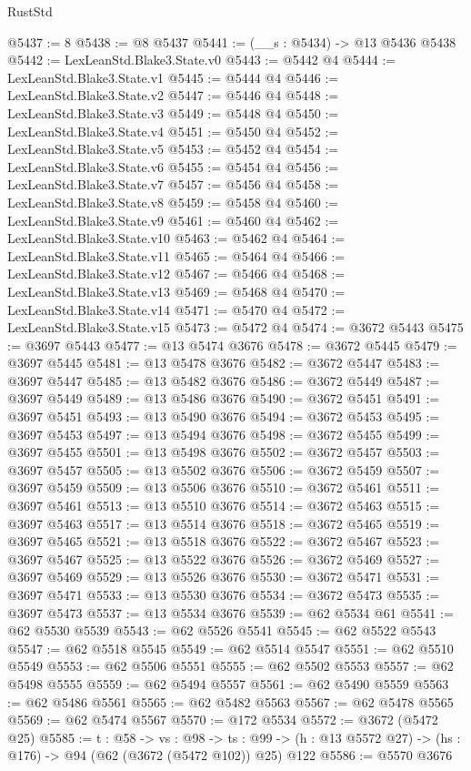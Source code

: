 \begin{lexlean}{RustStd}
\begin{coremodule}
{\begin{coremodule}
{{{{{{{{{{{@5437 := 8
@5438 := @8 @5437
@5441 := (__s : @5434) -> @13 @5436 @5438
@5442 := LexLeanStd.Blake3.State.v0
@5443 := @5442 @4
@5444 := LexLeanStd.Blake3.State.v1
@5445 := @5444 @4
@5446 := LexLeanStd.Blake3.State.v2
@5447 := @5446 @4
@5448 := LexLeanStd.Blake3.State.v3
@5449 := @5448 @4
@5450 := LexLeanStd.Blake3.State.v4
@5451 := @5450 @4
@5452 := LexLeanStd.Blake3.State.v5
@5453 := @5452 @4
@5454 := LexLeanStd.Blake3.State.v6
@5455 := @5454 @4
@5456 := LexLeanStd.Blake3.State.v7
@5457 := @5456 @4
@5458 := LexLeanStd.Blake3.State.v8
@5459 := @5458 @4
@5460 := LexLeanStd.Blake3.State.v9
@5461 := @5460 @4
@5462 := LexLeanStd.Blake3.State.v10
@5463 := @5462 @4
@5464 := LexLeanStd.Blake3.State.v11
@5465 := @5464 @4
@5466 := LexLeanStd.Blake3.State.v12
@5467 := @5466 @4
@5468 := LexLeanStd.Blake3.State.v13
@5469 := @5468 @4
@5470 := LexLeanStd.Blake3.State.v14
@5471 := @5470 @4
@5472 := LexLeanStd.Blake3.State.v15
@5473 := @5472 @4
@5474 := @3672 @5443
@5475 := @3697 @5443
@5477 := @13 @5474 @3676
@5478 := @3672 @5445
@5479 := @3697 @5445
@5481 := @13 @5478 @3676
@5482 := @3672 @5447
@5483 := @3697 @5447
@5485 := @13 @5482 @3676
@5486 := @3672 @5449
@5487 := @3697 @5449
@5489 := @13 @5486 @3676
@5490 := @3672 @5451
@5491 := @3697 @5451
@5493 := @13 @5490 @3676
@5494 := @3672 @5453
@5495 := @3697 @5453
@5497 := @13 @5494 @3676
@5498 := @3672 @5455
@5499 := @3697 @5455
@5501 := @13 @5498 @3676
@5502 := @3672 @5457
@5503 := @3697 @5457
@5505 := @13 @5502 @3676
@5506 := @3672 @5459
@5507 := @3697 @5459
@5509 := @13 @5506 @3676
@5510 := @3672 @5461
@5511 := @3697 @5461
@5513 := @13 @5510 @3676
@5514 := @3672 @5463
@5515 := @3697 @5463
@5517 := @13 @5514 @3676
@5518 := @3672 @5465
@5519 := @3697 @5465
@5521 := @13 @5518 @3676
@5522 := @3672 @5467
@5523 := @3697 @5467
@5525 := @13 @5522 @3676
@5526 := @3672 @5469
@5527 := @3697 @5469
@5529 := @13 @5526 @3676
@5530 := @3672 @5471
@5531 := @3697 @5471
@5533 := @13 @5530 @3676
@5534 := @3672 @5473
@5535 := @3697 @5473
@5537 := @13 @5534 @3676
@5539 := @62 @5534 @61
@5541 := @62 @5530 @5539
@5543 := @62 @5526 @5541
@5545 := @62 @5522 @5543
@5547 := @62 @5518 @5545
@5549 := @62 @5514 @5547
@5551 := @62 @5510 @5549
@5553 := @62 @5506 @5551
@5555 := @62 @5502 @5553
@5557 := @62 @5498 @5555
@5559 := @62 @5494 @5557
@5561 := @62 @5490 @5559
@5563 := @62 @5486 @5561
@5565 := @62 @5482 @5563
@5567 := @62 @5478 @5565
@5569 := @62 @5474 @5567
@5570 := @172 @5534
@5572 := @3672 (@5472 @25)
@5585 := {t : @58} ->
  {vs : @98} ->
  {ts : @99} -> (h : @13 @5572 @27) -> (hs : @176) -> @94 (@62 (@3672 (@5472 @102)) @25) @122
@5586 := @5570 @3676
}}}}}}}}}}}
\end{coremodule}}
\end{coremodule}
\end{lexlean}
